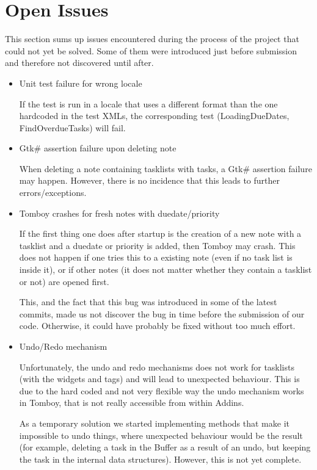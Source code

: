 \section{Open Issues}
\label{issues}

This section sums up issues encountered during the process of the project that could not yet be solved.
Some of them were introduced just before submission and therefore not discovered until after.

\begin{itemize}
\item Unit test failure for wrong locale

  If the test is run in a locale that uses a different format than the one hardcoded in the test XMLs, the corresponding test (LoadingDueDates, FindOverdueTasks) will fail.

\item Gtk\# assertion failure upon deleting note

  When deleting a note containing tasklists with tasks, a Gtk\# assertion failure may happen.
  However, there is no incidence that this leads to further errors/exceptions.

\item Tomboy crashes for fresh notes with duedate/priority

  If the first thing one does after startup is the creation of a new note with a tasklist and a duedate or priority is added, then Tomboy may crash. This does not happen if one tries this to a existing note (even if no task list is inside it), or if other notes (it does not matter whether they contain a tasklist or not) are opened first. 
  
This, and the fact that this bug was introduced in some of the latest commits, made us not discover the bug in time before the submission of our code. Otherwise, it could have probably be fixed without too much effort.

\item Undo/Redo mechanism

  Unfortunately, the undo and redo mechanisms does not work for tasklists (with the widgets and tags) and will lead to unexpected behaviour. This is due to the hard coded and not very flexible way the undo mechanism works in Tomboy, that is not really accessible from within Addins.
  
  As a temporary solution we started implementing methods that make it impossible to undo things, where unexpected behaviour would be the result (for example, deleting a task in the Buffer as a result of an undo, but keeping the task in the internal data structures). However, this is not yet complete.


\end{itemize}
